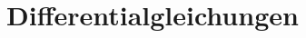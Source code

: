 \documentclass[
../../Mathe2Zusammenfassung2024.tex,
]
{subfiles}
\begin{document}
\section{Differentialgleichungen}
\end{document}
